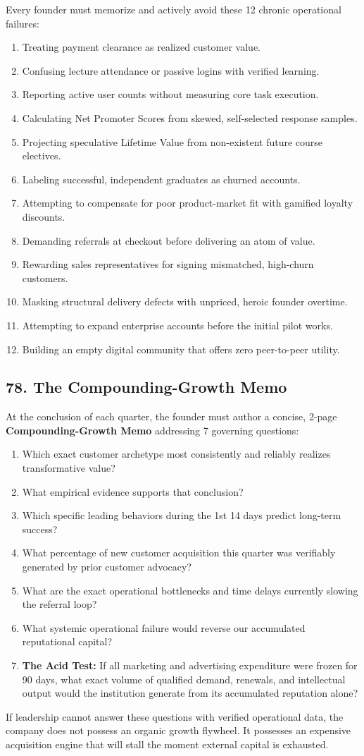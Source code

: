 Every founder must memorize and actively avoid these 12 chronic operational failures:
\begin{enumerate}[leftmargin=*]
\item Treating payment clearance as realized customer value.
\item Confusing lecture attendance or passive logins with verified learning.
\item Reporting active user counts without measuring core task execution.
\item Calculating Net Promoter Scores from skewed, self-selected response samples.
\item Projecting speculative Lifetime Value from non-existent future course electives.
\item Labeling successful, independent graduates as churned accounts.
\item Attempting to compensate for poor product-market fit with gamified loyalty discounts.
\item Demanding referrals at checkout before delivering an atom of value.
\item Rewarding sales representatives for signing mismatched, high-churn customers.
\item Masking structural delivery defects with unpriced, heroic founder overtime.
\item Attempting to expand enterprise accounts before the initial pilot works.
\item Building an empty digital community that offers zero peer-to-peer utility.
\end{enumerate}

\subsection*{78. The Compounding-Growth Memo}

At the conclusion of each quarter, the founder must author a concise, 2-page \textbf{Compounding-Growth Memo} addressing 7 governing questions:
\begin{enumerate}[leftmargin=*]
\item Which exact customer archetype most consistently and reliably realizes transformative value?
\item What empirical evidence supports that conclusion?
\item Which specific leading behaviors during the 1st 14 days predict long-term success?
\item What percentage of new customer acquisition this quarter was verifiably generated by prior customer advocacy?
\item What are the exact operational bottlenecks and time delays currently slowing the referral loop?
\item What systemic operational failure would reverse our accumulated reputational capital?
\item \textbf{The Acid Test:} If all marketing and advertising expenditure were frozen for 90 days, what exact volume of qualified demand, renewals, and intellectual output would the institution generate from its accumulated reputation alone?
\end{enumerate}

If leadership cannot answer these questions with verified operational data, the company does not possess an organic growth flywheel. It possesses an expensive acquisition engine that will stall the moment external capital is exhausted.
